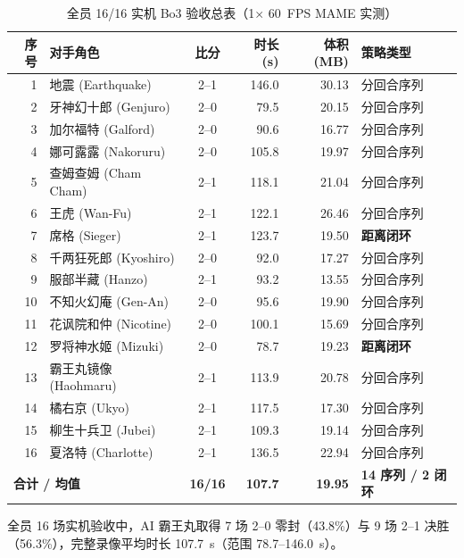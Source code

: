 \documentclass[10pt,twocolumn]{article}
\begin{document}
\begin{table}[t]
\centering
\caption{全员 16/16 实机 Bo3 验收总表（1$\times$ 60~FPS MAME 实测）}
\label{tab:results}
\scriptsize
\begin{tabular}{r l c r r l}
\hline
\textbf{序号} & \textbf{对手角色} & \textbf{比分} & \textbf{时长(s)} & \textbf{体积(MB)} & \textbf{策略类型} \\
\hline
1  & 地震 (Earthquake)     & 2--1 & 146.0 & 30.13 & 分回合序列 \\
2  & 牙神幻十郎 (Genjuro)  & 2--0 &  79.5 & 20.15 & 分回合序列 \\
3  & 加尔福特 (Galford)    & 2--0 &  90.6 & 16.77 & 分回合序列 \\
4  & 娜可露露 (Nakoruru)   & 2--0 & 105.8 & 19.97 & 分回合序列 \\
5  & 查姆查姆 (Cham Cham)  & 2--1 & 118.1 & 21.04 & 分回合序列 \\
6  & 王虎 (Wan-Fu)         & 2--1 & 122.1 & 26.46 & 分回合序列 \\
7  & 席格 (Sieger)         & 2--1 & 123.7 & 19.50 & \textbf{距离闭环} \\
8  & 千两狂死郎 (Kyoshiro) & 2--0 &  92.0 & 17.27 & 分回合序列 \\
9  & 服部半藏 (Hanzo)      & 2--1 &  93.2 & 13.55 & 分回合序列 \\
10 & 不知火幻庵 (Gen-An)   & 2--0 &  95.6 & 19.90 & 分回合序列 \\
11 & 花讽院和仲 (Nicotine) & 2--0 & 100.1 & 15.69 & 分回合序列 \\
12 & 罗将神水姬 (Mizuki)   & 2--0 &  78.7 & 19.23 & \textbf{距离闭环} \\
13 & 霸王丸镜像 (Haohmaru) & 2--1 & 113.9 & 20.78 & 分回合序列 \\
14 & 橘右京 (Ukyo)         & 2--1 & 117.5 & 17.30 & 分回合序列 \\
15 & 柳生十兵卫 (Jubei)    & 2--1 & 109.3 & 19.14 & 分回合序列 \\
16 & 夏洛特 (Charlotte)    & 2--1 & 136.5 & 22.94 & 分回合序列 \\
\hline
\multicolumn{2}{l}{\textbf{合计 / 均值}} & \textbf{16/16} & \textbf{107.7} & \textbf{19.95} & \textbf{14 序列 / 2 闭环} \\
\hline
\end{tabular}
\end{table}

全员 16 场实机验收中，AI 霸王丸取得 7 场 2--0 零封（43.8\%）与 9 场 2--1 决胜（56.3\%），完整录像平均时长 107.7~s（范围 78.7--146.0~s）。
\end{document}
